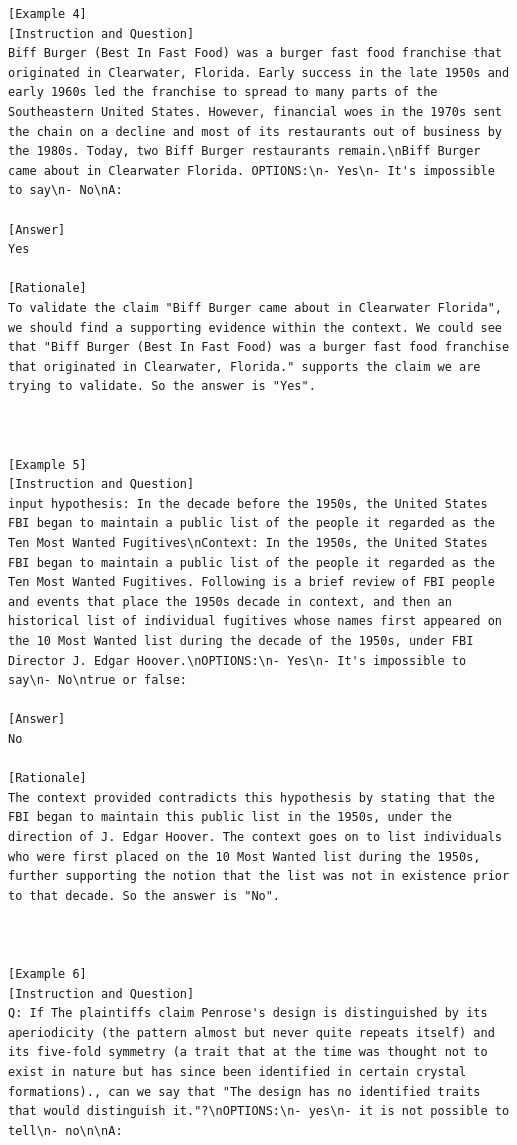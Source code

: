 \begin{lstlisting}[caption={Demonstration used for tasks in family of NLI (FLAN)}, label=nli prompt,captionpos=b]
[Example 4]
[Instruction and Question]
Biff Burger (Best In Fast Food) was a burger fast food franchise that originated in Clearwater, Florida. Early success in the late 1950s and early 1960s led the franchise to spread to many parts of the Southeastern United States. However, financial woes in the 1970s sent the chain on a decline and most of its restaurants out of business by the 1980s. Today, two Biff Burger restaurants remain.\nBiff Burger came about in Clearwater Florida. OPTIONS:\n- Yes\n- It's impossible to say\n- No\nA: 

[Answer]
Yes

[Rationale]
To validate the claim "Biff Burger came about in Clearwater Florida", we should find a supporting evidence within the context. We could see that "Biff Burger (Best In Fast Food) was a burger fast food franchise that originated in Clearwater, Florida." supports the claim we are trying to validate. So the answer is "Yes".



[Example 5]
[Instruction and Question]
input hypothesis: In the decade before the 1950s, the United States FBI began to maintain a public list of the people it regarded as the Ten Most Wanted Fugitives\nContext: In the 1950s, the United States FBI began to maintain a public list of the people it regarded as the Ten Most Wanted Fugitives. Following is a brief review of FBI people and events that place the 1950s decade in context, and then an historical list of individual fugitives whose names first appeared on the 10 Most Wanted list during the decade of the 1950s, under FBI Director J. Edgar Hoover.\nOPTIONS:\n- Yes\n- It's impossible to say\n- No\ntrue or false: 

[Answer]
No

[Rationale]
The context provided contradicts this hypothesis by stating that the FBI began to maintain this public list in the 1950s, under the direction of J. Edgar Hoover. The context goes on to list individuals who were first placed on the 10 Most Wanted list during the 1950s, further supporting the notion that the list was not in existence prior to that decade. So the answer is "No".



[Example 6]
[Instruction and Question]
Q: If The plaintiffs claim Penrose's design is distinguished by its aperiodicity (the pattern almost but never quite repeats itself) and its five-fold symmetry (a trait that at the time was thought not to exist in nature but has since been identified in certain crystal formations)., can we say that "The design has no identified traits that would distinguish it."?\nOPTIONS:\n- yes\n- it is not possible to tell\n- no\n\nA: 


\end{lstlisting}
